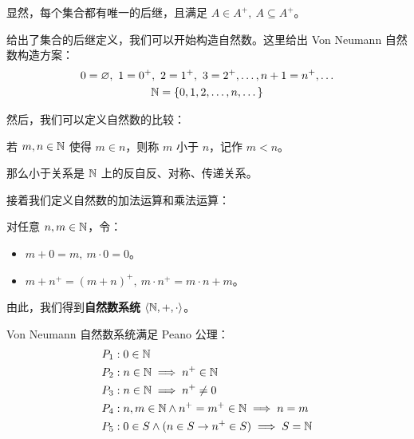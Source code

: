 显然，每个集合都有唯一的后继，且满足 $A \in A^{+},\ A \subseteq A^{+}$。

给出了集合的后继定义，我们可以开始构造自然数。这里给出 Von Neumann 自然数构造方案：
$$
\begin{gathered}
    0 = \varnothing,\ 1 = 0^{+},\ 2 = 1^{+},\ 3 = 2^{+}, \dots, n + 1 = n^{+}, \dots \\
    \mathbb{N} = \{0, 1, 2, \dots, n, \dots\}
\end{gathered}
$$

然后，我们可以定义自然数的比较：

\begin{definition}[自然数的小于]
    若 $m, n \in \mathbb{N}$ 使得 $m \in n$，则称 $m$ 小于 $n$，记作 $m < n$。
\end{definition}

那么小于关系是 $\mathbb{N}$ 上的反自反、对称、传递关系。

接着我们定义自然数的加法运算和乘法运算：

\begin{definition}[自然数的加法和乘法]
    对任意 $n, m \in \mathbb{N}$，令：
    \begin{itemize}
        \item $m + 0 = m,\ m \cdot 0 = 0$。
        \item $m + n^{+} = (m + n)^{+},\ m \cdot n^{+} = m \cdot n + m$。
    \end{itemize}
\end{definition}

由此，我们得到\textbf{自然数系统} $\langle \mathbb{N}, +, \cdot \rangle$。

\begin{theorem}[Peano 公理]
    Von Neumann 自然数系统满足 Peano 公理：
    $$
    \begin{aligned}
        & P_1: 0 \in \mathbb{N} \\
        & P_2: n \in \mathbb{N} \implies n^{+} \in \mathbb{N} \\
        & P_3: n \in \mathbb{N} \implies n^{+} \neq 0 \\
        & P_4: n, m \in \mathbb{N} \land n^{+} = m^{+} \in \mathbb{N} \implies n = m \\
        & P_5: 0 \in S \land (n \in S \to n^{+} \in S) \implies S = \mathbb{N}
    \end{aligned}
    $$
\end{theorem}